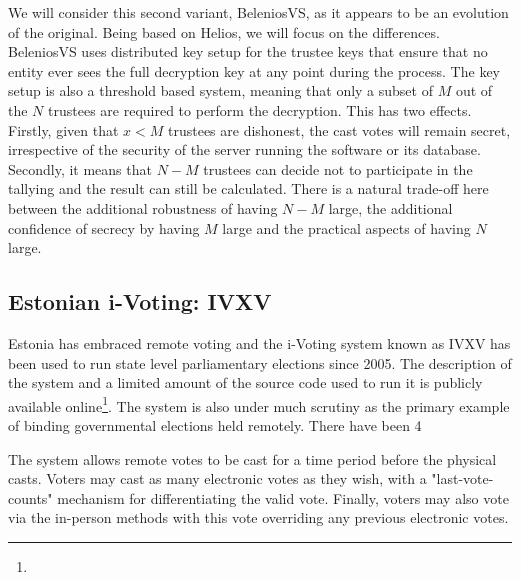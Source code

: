 We will consider this second variant, BeleniosVS, as it appears to be an evolution of the original. Being based on Helios, we will focus on the differences. BeleniosVS uses distributed key setup for the trustee keys that ensure that no entity ever sees the full decryption key at any point during the process. The key setup is also a threshold based system, meaning that only a subset of $M$ out of the $N$ trustees are required to perform the decryption. This has two effects. Firstly, given that $x < M$ trustees are dishonest, the cast votes will remain secret, irrespective of the security of the server running the software or its database. Secondly, it means that $N-M$ trustees can decide not to participate in the tallying and the result can still be calculated. There is a natural trade-off here between the additional robustness of having $N-M$ large, the additional confidence of secrecy by having $M$ large and the practical aspects of having $N$ large.



\subsection{Estonian i-Voting: IVXV}

Estonia has embraced remote voting and the i-Voting system known as IVXV has been used to run state level parliamentary elections since 2005. The description of the system and a limited amount of the source code used to run it is publicly available online\footnote{}. The system is also under much scrutiny as the primary example of binding governmental elections held remotely. There have been 4

The system allows remote votes to be cast for a time period before the physical casts. Voters may cast as many electronic votes as they wish, with a "last-vote-counts" mechanism for differentiating the valid vote. Finally, voters may also vote via the in-person methods with this vote overriding any previous electronic votes.





